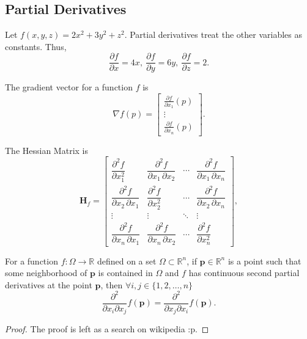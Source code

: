 \documentclass[12pt]{scrartcl}
\begin{document}
\subsection{Partial Derivatives}
Let $f(x,y,z) = 2x^2+3y^2+z^2$. Partial derivatives treat the other variables as constants.
Thus, $$\frac{\partial f}{\partial x} = 4x, ~ \frac{\partial f}{\partial y} = 6y, ~ \frac{\partial f}{\partial z} = 2.$$
\begin{definition}
The \alert{gradient vector} for a function $f$ is $${\displaystyle \nabla f(p)={\begin{bmatrix}{\frac {\partial f}{\partial x_{1}}}(p)\\\vdots \\{\frac {\partial f}{\partial x_{n}}}(p)\end{bmatrix}}.}$$
\end{definition}
\begin{definition}
The \alert{Hessian Matrix} is 
$${\displaystyle \mathbf {H} _{f}={\begin{bmatrix}{\dfrac {\partial ^{2}f}{\partial x_{1}^{2}}}&{\dfrac {\partial ^{2}f}{\partial x_{1}\,\partial x_{2}}}&\cdots &{\dfrac {\partial ^{2}f}{\partial x_{1}\,\partial x_{n}}}\\[2.2ex]{\dfrac {\partial ^{2}f}{\partial x_{2}\,\partial x_{1}}}&{\dfrac {\partial ^{2}f}{\partial x_{2}^{2}}}&\cdots &{\dfrac {\partial ^{2}f}{\partial x_{2}\,\partial x_{n}}}\\[2.2ex]\vdots &\vdots &\ddots &\vdots \\[2.2ex]{\dfrac {\partial ^{2}f}{\partial x_{n}\,\partial x_{1}}}&{\dfrac {\partial ^{2}f}{\partial x_{n}\,\partial x_{2}}}&\cdots &{\dfrac {\partial ^{2}f}{\partial x_{n}^{2}}}\end{bmatrix}},}$$
\end{definition}

\begin{theorem}
    For a function $f:\Omega \rightarrow \mathbb{R}$ defined on a set $\Omega \subset \mathbb{R}^n$, if $\mathbf{p} \in
    \mathbb{R}^n$ is a point such that some neighborhood of $\mathbf{p}$ is contained in $\Omega$ and $f$ has continuous
    second partial derivatives at the point $\mathbf{p}$, then $\forall i,j \in \{1,2,\dots,n\}$
    $$\frac{\partial^2}{\partial x_i \partial x_j}f(\mathbf{p})=\frac{\partial^2}{\partial x_j\partial x_i}f(\mathbf{p}).$$
\end{theorem}
\begin{proof}
    The proof is left as a search on wikipedia :p.
\end{proof}
\end{document}

